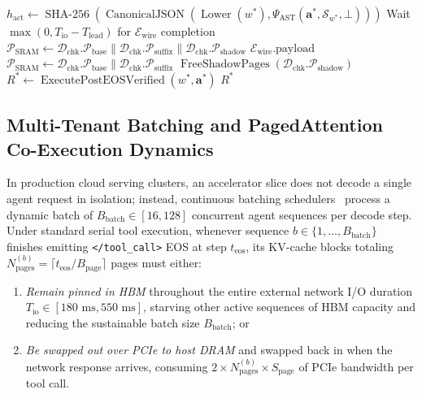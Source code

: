 \documentclass[10pt,conference]{IEEEtran}
\begin{document}
\begin{algorithm}[t]
{\begin{minipage}{1.20\columnwidth}
\begin{algorithmic}[1]
\State $h_{\text{act}} \leftarrow \operatorname{SHA-256}(\operatorname{CanonicalJSON}(\operatorname{Lower}(w^*), \Psi_{\text{AST}}(\mathbf{a}^*, \mathcal{S}_{w^*}, \bot)))$
 
    \State Wait $\max(0, T_{\text{io}} - T_{\text{lead}})$ for $\mathcal{E}_{\text{wire}}$ completion
    \State $\mathcal{P}_{\text{SRAM}} \leftarrow \mathcal{D}_{\text{chk}}.\mathcal{P}_{\text{base}} \parallel \mathcal{D}_{\text{chk}}.\mathcal{P}_{\text{suffix}} \parallel \mathcal{D}_{\text{chk}}.\mathcal{P}_{\text{shadow}}$ 
    \State \Return $\mathcal{E}_{\text{wire}}.\text{payload}$
\Else {}
    \State $\mathcal{P}_{\text{SRAM}} \leftarrow \mathcal{D}_{\text{chk}}.\mathcal{P}_{\text{base}} \parallel \mathcal{D}_{\text{chk}}.\mathcal{P}_{\text{suffix}}$ 
    \State $\operatorname{FreeShadowPages}(\mathcal{D}_{\text{chk}}.\mathcal{P}_{\text{shadow}})$
    \State $R^* \leftarrow \operatorname{ExecutePostEOSVerified}(w^*, \mathbf{a}^*)$
    \State \Return $R^*$
\EndIf
\end{algorithmic}
\end{minipage}%
}
\end{algorithm}

\subsection{Multi-Tenant Batching and PagedAttention Co-Execution Dynamics}
In production cloud serving clusters, an accelerator slice does not decode a single agent request in isolation; instead, continuous batching schedulers~\cite{kwon2023efficient, zheng2024sglang} process a dynamic batch of $B_{\text{batch}} \in [16, 128]$ concurrent agent sequences per decode step. Under standard serial tool execution, whenever sequence $b \in \{1, \dots, B_{\text{batch}}\}$ finishes emitting \texttt{</tool\_call>} EOS at step $t_{\text{eos}}$, its KV-cache blocks totaling $N_{\text{pages}}^{(b)} = \lceil t_{\text{eos}} / B_{\text{page}} \rceil$ pages must either:
\begin{enumerate}
    \item \emph{Remain pinned in HBM} throughout the entire external network I/O duration $T_{\text{io}} \in [180\text{ ms}, 550\text{ ms}]$, starving other active sequences of HBM capacity and reducing the sustainable batch size $B_{\text{batch}}$; or
    \item \emph{Be swapped out over PCIe to host DRAM} and swapped back in when the network response arrives, consuming $2 \times N_{\text{pages}}^{(b)} \times S_{\text{page}}$ of PCIe bandwidth per tool call.
\end{enumerate}
\end{document}

